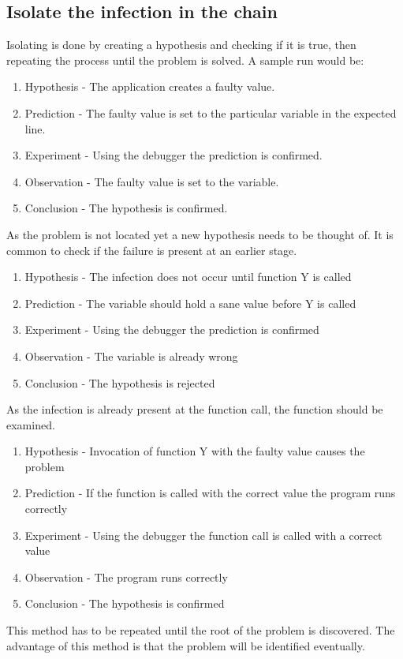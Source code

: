 \subsection{Isolate the infection in the chain}
\label{aodZellerIsolateDefect}
Isolating is done by creating a hypothesis and checking if it is true, then repeating the process until the problem is solved. A sample run would be:
\begin{enumerate}
  \item Hypothesis - The application creates a faulty value.
  \item Prediction - The faulty value is set to the particular variable in the expected line.
  \item Experiment - Using the debugger the prediction is confirmed.
  \item Observation - The faulty value is set to the variable.
  \item Conclusion - The hypothesis is confirmed.
\end{enumerate}
As the problem is not located yet a new hypothesis needs to be thought of. It is common to check if the failure is present at an earlier stage.
\begin{enumerate}
  \item Hypothesis - The infection does not occur until function Y is called
  \item Prediction - The variable should hold a sane value before Y is called
  \item Experiment - Using the debugger the prediction is confirmed
  \item Observation - The variable is already wrong
  \item Conclusion - The hypothesis is rejected
\end{enumerate}
As the infection is already present at the function call, the function should be examined.
\begin{enumerate}
  \item Hypothesis - Invocation of function Y with the faulty value causes the problem
  \item Prediction - If the function is called with the correct value the program runs correctly
  \item Experiment - Using the debugger the function call is called with a correct value
  \item Observation - The program runs correctly
  \item Conclusion - The hypothesis is confirmed
\end{enumerate}
This method has to be repeated until the root of the problem is discovered. The advantage of this method is that the problem will be identified eventually.

